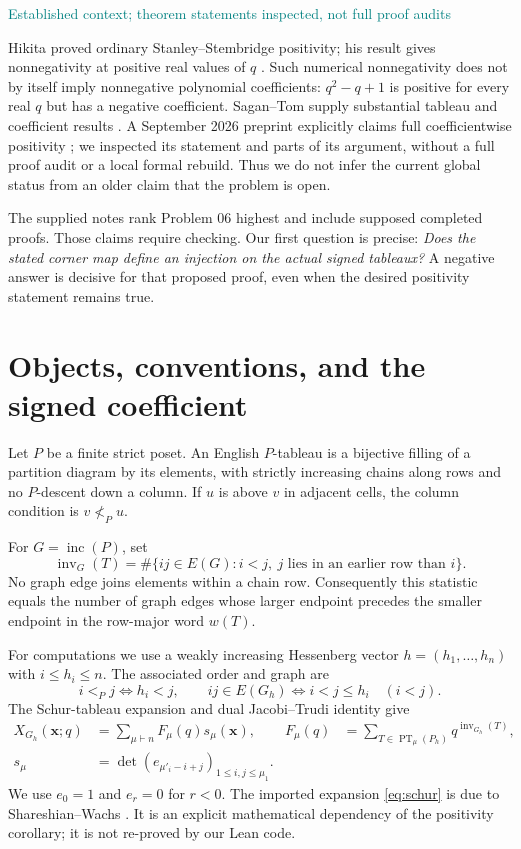\documentclass[11pt,a4paper]{article}
\theoremstyle{definition}
\newcommand{\PT}{\operatorname{PT}}
\newcommand{\inv}{\operatorname{inv}}
\newcommand{\inc}{\operatorname{inc}}
\newcommand{\tagline}[1]{\par\smallskip\noindent\textcolor{teal}{\small\textsf{#1}}\par\smallskip}
\begin{document}
\tagline{Established context; theorem statements inspected, not full proof audits}
Hikita proved ordinary Stanley--Stembridge positivity; his result gives
nonnegativity at positive real values of $q$ \cite{hikita}. Such numerical
nonnegativity does not by itself imply nonnegative polynomial coefficients:
$q^2-q+1$ is positive for every real $q$ but has a negative coefficient.
Sagan--Tom supply substantial tableau and coefficient results
\cite{sagantom}. A September 2026 preprint explicitly claims full
coefficientwise positivity \cite{openai}; we inspected its statement and parts
of its argument, without a full proof audit or a local formal rebuild.
Thus we do not infer the current global status from an older claim that the
problem is open.

The supplied notes rank Problem 06 highest and include supposed completed
proofs. Those claims require checking. Our first question is precise:
\emph{Does the stated corner map define an injection on the actual signed
tableaux?} A negative answer is decisive for that proposed proof, even when
the desired positivity statement remains true.

\section{Objects, conventions, and the signed coefficient}

Let $P$ be a finite strict poset. An English $P$-tableau is a bijective filling
of a partition diagram by its elements, with strictly increasing chains along
rows and no $P$-descent down a column. If $u$ is above $v$ in adjacent cells,
the column condition is $v\not<_P u$.

For $G=\inc(P)$, set
\[
 \inv_G(T)=\#\{ij\in E(G):i<j,\ \text{$j$ lies in an earlier row than $i$}\}.
\]
No graph edge joins elements within a chain row. Consequently this statistic
equals the number of graph edges whose larger endpoint precedes the smaller
endpoint in the row-major word $w(T)$.

For computations we use a weakly increasing Hessenberg vector
$h=(h_1,\ldots,h_n)$ with $i\le h_i\le n$. The associated order and graph are
\[
 i<_P j\iff h_i<j,\qquad
 ij\in E(G_h)\iff i<j\le h_i\quad(i<j).
\]
The Schur-tableau expansion and dual Jacobi--Trudi identity give
\begin{align}
 X_{G_h}(\mathbf x;q)&=\sum_{\mu\vdash n}F_\mu(q)s_\mu(\mathbf x),
 &F_\mu(q)&=\sum_{T\in\PT_\mu(P_h)}q^{\inv_{G_h}(T)},\label{eq:schur}\\
 s_\mu&=\det(e_{\mu'_i-i+j})_{1\le i,j\le\mu_1}.
 \label{eq:djt}
\end{align}
We use $e_0=1$ and $e_r=0$ for $r<0$. The imported expansion
\eqref{eq:schur} is due to Shareshian--Wachs \cite{sw}.
It is an explicit mathematical dependency of the positivity corollary; it is
not re-proved by our Lean code.
\end{document}
